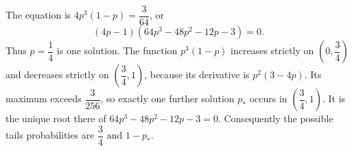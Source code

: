 The equation is $ 4p^3(1-p)=\dfrac{3}{64}$, or
\[(4p-1)(64p^3-48p^2-12p-3)=0.\]
Thus $ p=\dfrac{1}{4}$ is one solution. The function $ p^3(1-p)$ increases strictly on $(0,\dfrac{3}{4})$ and decreases strictly on $(\dfrac{3}{4},1)$, because its derivative is $ p^2(3-4p)$. Its maximum exceeds $\dfrac{3}{256}$, so exactly one further solution $ p_*$ occurs in $(\dfrac{3}{4},1)$. It is the unique root there of $ 64p^3-48p^2-12p-3=0 $. Consequently the possible tails probabilities are $\boxed{\dfrac{3}{4}\text{ and }1-p_*}$.

